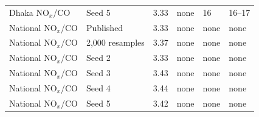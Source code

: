 \begin{longtable}{L{2.6cm} L{2.4cm} C{0.9cm} L{2.0cm} L{3.6cm} L{2.0cm}}
Dhaka NO$_x$/CO & Seed 5 & 3.33 & none & 16 & 16--17 \\
National NO$_x$/CO & Published & 3.33 & none & none & none \\
National NO$_x$/CO & 2,000 resamples & 3.37 & none & none & none \\
National NO$_x$/CO & Seed 2 & 3.33 & none & none & none \\
National NO$_x$/CO & Seed 3 & 3.43 & none & none & none \\
National NO$_x$/CO & Seed 4 & 3.44 & none & none & none \\
National NO$_x$/CO & Seed 5 & 3.42 & none & none & none \\
\end{longtable}
\endgroup
